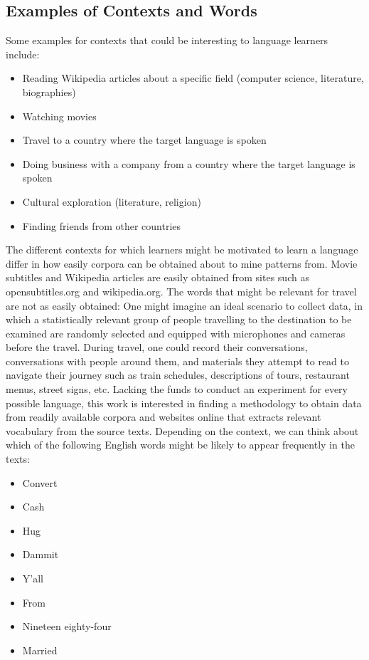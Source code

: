 \subsection{Examples of Contexts and Words}
Some examples for contexts that could be interesting to language learners include:

\begin{itemize}
	\item Reading Wikipedia articles about a specific field (computer science, literature, biographies)
	\item Watching movies
	\item Travel to a country where the target language is spoken
	\item Doing business with a company from a country where the target language is spoken
	\item Cultural exploration (literature, religion)
	\item Finding friends from other countries
\end{itemize}

The different contexts for which learners might be motivated to learn a language differ in how easily corpora can be obtained about to mine patterns from. Movie subtitles and Wikipedia articles are easily obtained from sites such as opensubtitles.org and wikipedia.org. The words that might be relevant for travel are not as easily obtained: One might imagine an ideal scenario to collect data, in which a statistically relevant group of people travelling to the destination to be examined are randomly selected and equipped with microphones and cameras before the travel. During travel, one could record their conversations, conversations with people around them, and materials they attempt to read to navigate their journey such as train schedules, descriptions of tours, restaurant menus, street signs, etc. Lacking the funds to conduct an experiment for every possible language, this work is interested in finding a methodology to obtain data from readily available corpora and websites online that extracts relevant vocabulary from the source texts.
Depending on the context, we can think about which of the following English words might be likely to appear frequently in the texts:

\begin{itemize}
	\item Convert
	\item Cash
	\item Hug
	\item Dammit
	\item Y'all
	\item From
	\item Nineteen eighty-four
	\item Married
\end{itemize}

